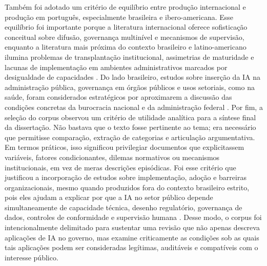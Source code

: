 \documentclass[12pt,a4paper]{article}
\begin{document}
Também foi adotado um critério de equilíbrio entre produção internacional e produção em português, especialmente brasileira e ibero-americana. Esse equilíbrio foi importante porque a literatura internacional oferece sofisticação conceitual sobre difusão, governança multinível e mecanismos de supervisão, enquanto a literatura mais próxima do contexto brasileiro e latino-americano ilumina problemas de transplantação institucional, assimetrias de maturidade e lacunas de implementação em ambientes administrativos marcados por desigualdade de capacidades \autocite{criado2024artificial} \autocite{criado2024inteligencia} \autocite{mariano2026inteligencia}. Do lado brasileiro, estudos sobre inserção da IA na administração pública, governança em órgãos públicos e usos setoriais, como na saúde, foram considerados estratégicos por aproximarem a discussão das condições concretas da burocracia nacional e da administração federal \autocite{serra2024a} \autocite{goulart2025processos} \autocite{lemes2020o}.
Por fim, a seleção do corpus observou um critério de utilidade analítica para a síntese final da dissertação. Não bastava que o texto fosse pertinente ao tema; era necessário que permitisse comparação, extração de categorias e articulação argumentativa. Em termos práticos, isso significou privilegiar documentos que explicitassem variáveis, fatores condicionantes, dilemas normativos ou mecanismos institucionais, em vez de meras descrições episódicas. Foi esse critério que justificou a incorporação de estudos sobre implementação, adoção e barreiras organizacionais, mesmo quando produzidos fora do contexto brasileiro estrito, pois eles ajudam a explicar por que a IA no setor público depende simultaneamente de capacidade técnica, desenho regulatório, governança de dados, controles de conformidade e supervisão humana \autocite{sharma2021implementing} \autocite{sigfrids2022how} \autocite{krtner2021predictive}. Desse modo, o corpus foi intencionalmente delimitado para sustentar uma revisão que não apenas descreva aplicações de IA no governo, mas examine criticamente as condições sob as quais tais aplicações podem ser consideradas legítimas, auditáveis e compatíveis com o interesse público.
\end{document}

